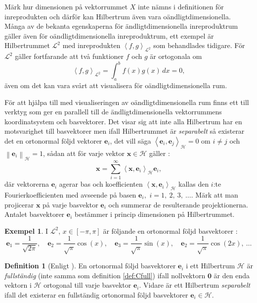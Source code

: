 \documentclass[a4paper, 12pt]{report}
\theoremstyle{definition}
\newtheorem{defi}{Definition}[section]
\newtheorem{ex}{Exempel}[section]
\theoremstyle{remark}
\newcommand{\bfx}{\mathbf{x}}
\newcommand{\llangle}{\left\langle}
\newcommand{\rrangle}{\right\rangle}
\newcommand{\inner}[2]{\llangle #1, #2 \rrangle}
\newcommand{\hil}{\mathcal{H}}
\begin{document}
Märk hur dimensionen på vektorrummet $X$ inte nämns i definitionen för inreprodukten och därför kan Hilbertrum även vara oändligtdimensionella. Många av de bekanta egenskaperna för ändligtdimensionella inreproduktrum gäller även för oändligtdimensionella inreproduktrum, ett exempel är Hilbertrummet $\mathcal{L}^2$ med inreprodukten $\inner{f}{g}_{\mathcal{L}^2}$ som behandlades tidigare. För $\mathcal{L}^2$ gäller fortfarande att två funktioner $f$ och $g$ är ortogonala om
\begin{equation*}
	\inner{f}{g}_{\mathcal{L}^2}=\int_{a}^{b}f(x)g(x) \, dx=0,
\end{equation*}
även om det kan vara svårt att visualisera för oändligtdimensionella rum.

För att hjälpa till med visualiseringen av oändligtdimensionella rum finns ett till verktyg som ger en parallell till de ändligtdimensionella vektorrummens koordinatsystem och basvektorer. Det visar sig att inte alla Hilbertrum har en motsvarighet till basvektorer men ifall Hilbertrummet är \emph{separabelt} så existerar det en ortonormal följd vektorer $\mathbf{e}_i$, det vill säga $\inner{\mathbf{e}_i}{\mathbf{e}_j}_\hil=0$ om $i\neq j$ och $\left\|\mathbf{e}_i\right\|_\hil=1$, sådan att för varje vektor $\mathbf{x}\in \mathcal{H}$  gäller \cite{Young}:
\begin{equation*}
\mathbf{x}=\sum_{i=1}^{\infty}\left\langle \mathbf{x}, \mathbf{e}_i \right\rangle_\hil \mathbf{e}_i,
\end{equation*}
där vektorerna $\mathbf{e}_i$ agerar bas och koefficienten $\left\langle \mathbf{x}, \mathbf{e}_i \right\rangle_\hil$ kallas den $i$:te Fourierkoefficienten med avseende på basen $\mathbf{e}_i,$ $i=1,~2,~3,~\dots$.
Märk att man projicerar $\bfx$ på varje basvektor $\mathbf{e}_i$ och summerar de resulterande projektionerna.
Antalet basvektorer $\mathbf{e}_i$ bestämmer i princip dimensionen på Hilbertrummet.

\begin{ex}
I $\mathcal{L}^2$, $x\in\left[-\pi,\pi\right]$ är följande en ortonormal följd basvektorer \cite{Young}:
\begin{equation*}
	\mathbf{e}_1=\frac{1}{\sqrt{2\pi}},\quad\mathbf{e}_2=\frac{1}{\sqrt{\pi}}\cos\left(x\right),\quad\mathbf{e}_3=\frac{1}{\sqrt{\pi}}\sin\left(x\right),\quad\mathbf{e}_2=\frac{1}{\sqrt{\pi}}\cos\left(2x\right),~\dots
\end{equation*}
\end{ex}

\begin{defi}[Enligt \cite{Young}]
	En ortonormal följd basvektorer $\mathbf{e}_i$ i ett Hilbertrum $\hil$ är \emph{fullständig} (inte samma som definition \ref{def:Cfull}) ifall nollvektorn $\mathbf{0}$ är den enda vektorn i $\hil$ ortogonal till varje basvektor $\mathbf{e}_i$. Vidare är ett Hilbertrum \emph{separabelt} ifall det existerar en fullständig ortonormal följd basvektorer $\mathbf{e}_i\in\hil$.
\end{defi}
\end{document}
